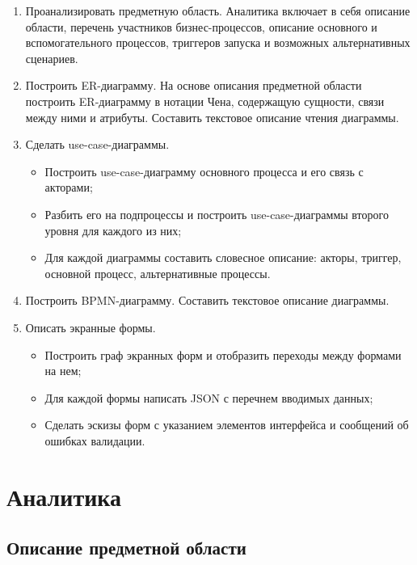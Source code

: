 \documentclass[11pt,a4paper,final]{article}
\begin{document}
	\begin{enumerate}
	
	\item Проанализировать предметную область. Аналитика включает в себя
	описание области, перечень участников бизнес-процессов, описание
	основного и вспомогательного процессов,
	триггеров запуска и возможных альтернативных сценариев.
	
	\item Построить ER-диаграмму.
	На основе описания предметной области построить ER-диаграмму в
	нотации Чена, содержащую сущности, связи между ними и атрибуты. Составить текстовое описание
	чтения диаграммы.
	
	\item Сделать use-case-диаграммы.
	\begin{itemize}
		\item Построить use-case-диаграмму основного
		процесса и его связь с акторами;
		\item Разбить его на подпроцессы и построить
		use-case-диаграммы второго уровня для каждого из них;
		\item Для каждой диаграммы составить словесное описание: акторы, триггер, основной процесс, альтернативные процессы.
	\end{itemize}
	
	\item Построить BPMN-диаграмму. Составить текстовое описание диаграммы.
	
	\item Описать экранные формы.
	\begin{itemize}
		\item Построить граф экранных форм и отобразить переходы между формами на нем;
		\item Для каждой формы написать JSON с перечнем вводимых данных;
		\item Сделать эскизы форм с указанием элементов интерфейса
		и сообщений об ошибках валидации.
	\end{itemize}
	\end{enumerate} 
	
	
	
	
	\newpage
	\section {Аналитика}
	\subsection{Описание предметной области}
	
\end{document}
